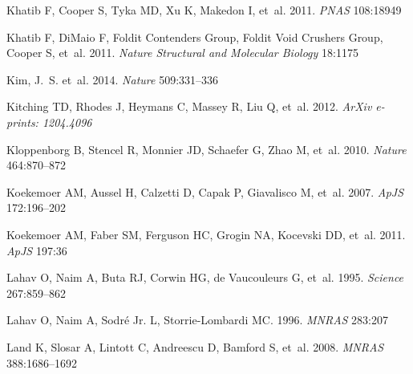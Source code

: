 \documentclass{ar2e}
\def\apjs{ApJS}
\def\mnras{MNRAS}
\def\nat{Nature}
\begin{document}
\begin{thebibliography}{}
{Khatib} F, {Cooper} S, {Tyka} MD, {Xu} K, {Makedon} I, et~al.
  2011{}.
\newblock \textit{{PNAS}} 108:18949

{Khatib} F, {DiMaio} F, {Foldit Contenders Group}, {Foldit Void Crushers
  Group}, {Cooper} S, et~al. 2011{}.
\newblock \textit{{Nature Structural and Molecular Biology}} 18:1175

{Kim}, J.~S. et~al. 2014.
\newblock \textit{\nat} 509:331--336

{Kitching} TD, {Rhodes} J, {Heymans} C, {Massey} R, {Liu} Q, et~al.
  2012{}.
\newblock \textit{ArXiv e-prints: 1204.4096}

{Kloppenborg} B, {Stencel} R, {Monnier} JD, {Schaefer} G, {Zhao} M, et~al.
  2010.
\newblock \textit{\nat} 464:870--872

{Koekemoer} AM, {Aussel} H, {Calzetti} D, {Capak} P, {Giavalisco} M, et~al.
  2007.
\newblock \textit{\apjs} 172:196--202

{Koekemoer} AM, {Faber} SM, {Ferguson} HC, {Grogin} NA, {Kocevski} DD, et~al.
  2011.
\newblock \textit{\apjs} 197:36

{Lahav} O, {Naim} A, {Buta} RJ, {Corwin} HG, {de Vaucouleurs} G, et~al. 1995.
\newblock \textit{Science} 267:859--862

{Lahav} O, {Naim} A, {Sodr{\'e}} Jr. L, {Storrie-Lombardi} MC. 1996.
\newblock \textit{\mnras} 283:207

{Land} K, {Slosar} A, {Lintott} C, {Andreescu} D, {Bamford} S, et~al. 2008.
\newblock \textit{\mnras} 388:1686--1692


\end{thebibliography}
\end{document}
